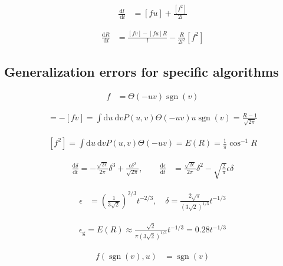 \documentclass{article}
\begin{document}
\begin{align*}
\frac{\mathrm{d} l}{\mathrm{~d} t} &= [f u] + \frac{\left[f^{2}\right]}{2 l} \tag{8.55}
\end{align*}

\begin{align*}
\frac{\mathrm{d} R}{\mathrm{~d} t} &= \frac{[f v] - [f u] R}{l} - \frac{R}{2 l^{2}} \left[f^{2}\right] \tag{8.56}
\end{align*}

\subsection{Generalization errors for specific algorithms}

\begin{align*}
f &= \Theta(-u v) \operatorname{sgn}(v) \tag{8.57}
\end{align*}

\begin{align*}
[f u]=-[f v]=\int \mathrm{d} u \mathrm{~d} v P(u, v) \Theta(-u v) u \operatorname{sgn}(v)=\frac{R-1}{\sqrt{2 \pi}}
\tag{8.58}
\end{align*}

\begin{align*}
\left[f^{2}\right]=\int \mathrm{d} u \mathrm{~d} v P(u, v) \Theta(-u v)=E(R)=\frac{1}{\pi} \cos ^{-1} R
\tag{8.59}
\end{align*}

\begin{align*}
\frac{\mathrm{d} \delta}{\mathrm{d} t} = -\frac{\sqrt{2 \epsilon}}{2 \pi} \delta^{3} + \frac{\epsilon \delta^{2}}{\sqrt{2 \pi}}, \qquad \frac{\mathrm{d} \epsilon}{\mathrm{d} t} &= \frac{\sqrt{2 \epsilon}}{2 \pi} \delta^{2} - \sqrt{\frac{2}{\pi}} \epsilon \delta
\tag{8.60}
\end{align*}

\begin{align*}
\epsilon &= \left(\frac{1}{3 \sqrt{2}}\right)^{2/3} t^{-2/3}, \quad \delta = \frac{2 \sqrt{\pi}}{(3 \sqrt{2})^{1/3}} t^{-1/3} \tag{8.61}
\end{align*}

\begin{align*}
\epsilon_{\mathrm{g}}=E(R) \approx \frac{\sqrt{2}}{\pi(3 \sqrt{2})^{1 / 3}} t^{-1 / 3}=0.28 t^{-1 / 3} 
\tag{8.62}
\end{align*}

\begin{align*}
f(\operatorname{sgn}(v), u) &= \operatorname{sgn}(v) \tag{8.63}
\end{align*}
\end{document}
